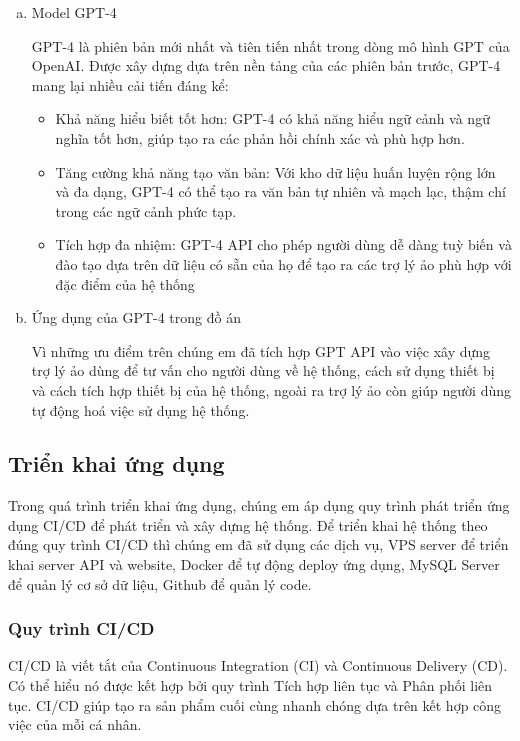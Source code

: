 \begin{enumerate}[a)]
\item Model GPT-4

GPT-4 là phiên bản mới nhất và tiên tiến nhất trong dòng mô hình GPT của OpenAI. 
Được xây dựng dựa trên nền tảng của các phiên bản trước, 
GPT-4 mang lại nhiều cải tiến đáng kể:

\begin{itemize}
  \item Khả năng hiểu biết tốt hơn: GPT-4 có khả năng hiểu ngữ cảnh và ngữ nghĩa tốt hơn, giúp tạo ra các phản hồi chính xác và phù hợp hơn.
  \item Tăng cường khả năng tạo văn bản: Với kho dữ liệu huấn luyện rộng lớn và đa dạng, GPT-4 có thể tạo ra văn bản tự nhiên và mạch lạc, thậm chí trong các ngữ cảnh phức tạp.
  \item Tích hợp đa nhiệm: GPT-4 API cho phép người dùng dễ dàng tuỳ biến và đào tạo dựa trên dữ liệu có sẵn của họ để tạo ra các trợ lý ảo phù hợp với đặc điểm của hệ thống
\end{itemize}

\item Ứng dụng của GPT-4 trong đồ án
\mbox{}

Vì những ưu điểm trên chúng em đã tích hợp GPT API vào việc xây dựng trợ lý ảo dùng để tư vấn cho người dùng về hệ thống, 
cách sử dụng thiết bị và cách tích hợp thiết bị của hệ thống, ngoài ra trợ lý ảo còn giúp người dùng tự động hoá việc sử dụng hệ thống.
\end{enumerate}

\subsection{Triển khai ứng dụng}
Trong quá trình triển khai ứng dụng, chúng em áp dụng quy trình phát triển ứng dụng CI/CD để phát triển và xây dựng hệ thống. Để triển khai hệ thống theo đúng quy trình CI/CD thì chúng em đã sử dụng các dịch vụ, VPS server để triển khai server API và website, Docker để tự động deploy ứng dụng, MySQL Server để quản lý cơ sở dữ liệu, Github để quản lý code.

\subsubsection{Quy trình CI/CD}
CI/CD là viết tắt của Continuous Integration (CI) và Continuous Delivery (CD). Có thể hiểu nó được kết hợp bởi quy trình Tích hợp liên tục và Phân phối liên tục. CI/CD giúp tạo ra sản phẩm cuối cùng nhanh chóng dựa trên kết hợp công việc của mỗi cá nhân.



